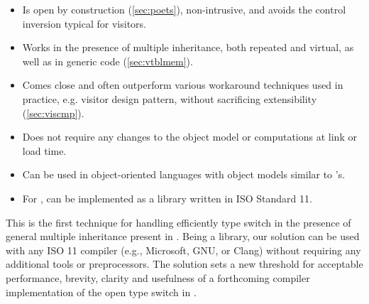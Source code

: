   \begin{itemize}
  \setlength{\itemsep}{0pt}
  \setlength{\parskip}{0pt}
  \item Is open by construction (\textsection\ref{sec:poets}), non-intrusive, 
        and avoids the control inversion typical for visitors. 
  \item Works in the presence of multiple inheritance, both repeated and 
        virtual, as well as in generic code (\textsection\ref{sec:vtblmem}).
  \item Comes close and often outperform various workaround techniques used in 
        practice, e.g. visitor design pattern, without sacrificing extensibility
        (\textsection\ref{sec:viscmp}). 
  \item Does not require any changes to the \Cpp{} object model or computations at 
        link or load time. 
  \item Can be used in object-oriented languages with 
        object models similar to \Cpp{}'s.
  \item For \Cpp{}, can be implemented as a library written in ISO Standard \Cpp{}11.
  \end{itemize}

\noindent
This is the first technique for handling efficiently type switch in the presence 
of general multiple inheritance present in \Cpp{}.
Being a library, our solution can be used with any 
ISO \Cpp{}11 compiler (e.g., Microsoft, GNU, or Clang) without requiring 
any additional tools or preprocessors. The solution
sets a new threshold for acceptable performance, brevity, clarity and
usefulness of a forthcoming compiler implementation of the open type switch in \Cpp{}.

